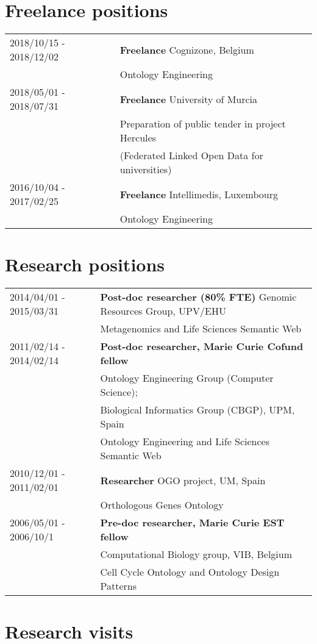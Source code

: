 \documentclass[11pt,fullpage]{article}
\begin{document}
\section*{Freelance positions}
\begin{tabular}{ll}

2018/10/15 - 2018/12/02 & {\bf Freelance} Cognizone, Belgium\\
              &  Ontology Engineering \\
2018/05/01 - 2018/07/31 & {\bf Freelance} University of Murcia \\
        &  Preparation of public tender in project Hercules\\
        & (Federated Linked Open Data for universities) \\
2016/10/04 - 2017/02/25 & {\bf Freelance} Intellimedis, Luxembourg\\
        &  Ontology Engineering \\
\end{tabular}


\section*{Research positions}
\begin{tabular}{ll}
2014/04/01 - 2015/03/31 & {\bf Post-doc researcher (80\% FTE)} Genomic Resources Group, UPV/EHU  \\
   & Metagenomics and Life Sciences Semantic Web \\
2011/02/14 - 2014/02/14 & {\bf Post-doc researcher, Marie Curie Cofund fellow} \\
     & Ontology Engineering Group (Computer Science); \\
     & Biological Informatics Group (CBGP), UPM, Spain \\
     & Ontology Engineering and Life Sciences Semantic Web \\
2010/12/01 - 2011/02/01 & {\bf Researcher} OGO project, UM, Spain \\
     & Orthologous Genes Ontology \\
2006/05/01 - 2006/10/1 & {\bf Pre-doc researcher, Marie Curie EST fellow} \\
    & Computational Biology group, VIB, Belgium \\
    & Cell Cycle Ontology and Ontology Design Patterns \\
\end{tabular}

\section*{Research visits}
\end{document}
